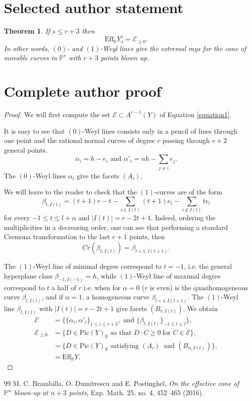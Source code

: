 \documentclass[10pt,a4paper]{amsart}
\newtheorem{theorem}{Theorem}
\def\bbR{\mathbb{R}}
\begin{document}
\section*{Selected author statement}
\begin{theorem}\label{effective cone}
 If $s \leq r+3$ then
 $$\text{Eff}_{\mathbb{R}} Y^r_s = \mathcal{E}_{\geq 0}.$$
In other words, $(0)$- and $(1)$-Weyl lines give the extremal rays
for the cone of movable curves in $\mathbb{P}^r$ with $r+3$ points blown up.
\end{theorem}
\section*{Complete author proof}
\begin{proof}
We will first compute the set $\mathcal{E} \subset A^{r-1}(Y)$ of Equation \eqref{equation1}.

It is easy to see that $(0)$-Weyl lines consists only in a pencil of lines through one point and the rational normal curves of degree $r$ passing through $r+2$ general points.
\[
\alpha_{i}=h-e_i \text{  and  } \alpha'_{i}=nh - \sum_{j\neq i} e_j.
\]
The $(0)$-Weyl lines $\alpha_{i}$ give the facets $(A_{i})$.

We will leave to the reader to check that the $(1)$-curves are of the form
\[
\beta_{t, I(t)} = (t+1)r-t - \sum_{i\in I(t)} (t+1)e_i -  \sum_{i\notin I(t)} t e_i
\]
for every $-1\leq t\leq l+\alpha$ and $|I(t)|=r-2t+1$.
Indeed, ordering the multiplicities in a decreasing order,
one can see that performing a standard Cremona transformation to the last $r+1$ points, then
\[
Cr(\beta_{t, I(t)}) = \beta_{t+1, I(t+1)}.
\]

The $(1)$-Weyl line of minimal degree correspond to $t=-1$,
i.e. the general hyperplane class $\beta_{-1, I(-1)}=h$,
while $(1)$-Weyl line of maximal degree correspond to $t$ a half of $r$
i.e. when
for $\alpha=0$ ($r$ is even) is the quasihomogeneous curve $\beta_{l, I(l)}$,
and if $\alpha=1$, a homogeneous curve $\beta_{l+1, I(l+1)}$.
The $(1)$-Weyl line $\beta_{t, I(t)}$ with $|I(t)|=r-2t+1$ give facets $(B_{r,I(t)})$.
We obtain
\begin{equation}
\begin{split}
 \mathcal{E}&=\{ \{\alpha_i, \alpha'_i\}_{1\leq i\leq r+3}, \text{ and } \{\beta_{t, I(t)}\}_{ -1 \leq t \leq l} \},\\
\mathcal{E}_{\geq 0}&=\{D\in \text{Pic}(Y)_{\bbR} \text{ so that } D \cdot C\geq 0\ \text{for } C\in \mathcal{E}\},\\
&=\{D\in \text{Pic}(Y)_{\bbR} \text{ satisfying } (A_{i})\ \text{ and } (B_{n,I(t)})\},\\
&= \text{Eff}_{\mathbb{R}} Y.
\end{split}
\end{equation}
\end{proof}
\begin{thebibliography}{99}
 M. C. Brambilla, O. Dumitrescu and E. Postinghel,
{\it On the effective cone of $\mathbb{P}^n$ blown-up at $n+3$ points},
 Exp. Math. 25, no. 4, 452--465 (2016).
\end{thebibliography}
\end{document}
